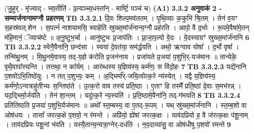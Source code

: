 \documentclass[17pt]{extarticle}
\begin{document}
{{{{{{{{{{{{{{{{{{{                  \newline
                                    (जु॒हुर् - मृ॑ज्याद् - भव॒तीति॑ - प्र॒त्यञ्च्य॒धस्ता᳚न् - मार्ष्टि॒ पञ्च॑ च) \textbf{(A1)} \newline \newline
                \textbf{ 3.3.2     अनुवाकं   2 - सम्मार्जनानामग्नौ प्रहरणम्} \newline
                                \textbf{ TB 3.3.2.1} \newline
                  दि॒वः शिल्प॒मव॑ततम् । पृ॒थि॒व्याः क॒कुभि॑ श्रि॒तम् । तेन॑ व॒यꣳ स॒हस्र॑वल्.शेन । स॒पत्नं॑ नाशयामसि॒ स्वाहेति॑ स्रुख्स॒मांर्ज॑नान्य॒ग्नौ प्रह॑रति । आपो॒ वै द॒र्भाः । रू॒पमे॒वैषा॑मे॒तन् म॑हि॒मानं॒ ॅव्याच॑ष्टे ॥ अ॒नु॒ष्टुभ॒र्चा । आनु॑ष्टुभः प्र॒जाप॑तिः । प्रा॒जा॒प॒त्यो वे॒दः । वे॒दस्याग्रꣳ॑ स्रुख्स॒मांर्ज॑नानि \textbf{ 6} \newline
                  \newline
                                \textbf{ TB 3.3.2.2} \newline
                  स्वेनै॒वैना॑नि॒ छन्द॑सा । स्वया॑ दे॒वत॑या॒ सम॑र्द्धयति । अथो॒ ऋग्वाव योषा᳚ । द॒र्भो वृषा᳚ । तन्मि॑थु॒नम् । मि॒थु॒नमे॒वास्य॒ तद्-य॒ज्ञे क॑रोति प्र॒जन॑नाय । प्रजा॑यते प्र॒जया॑ प॒शुभि॒र्-यज॑मानः ॥ तान्येके॒ वृथै॒वापा᳚स्यन्ति । तत्तथा॒ न का᳚र्यम् । आर॑ब्धस्य य॒ज्ञिय॑स्य॒ कर्म॑णः॒ स वि॑दो॒हः \textbf{ 7} \newline
                  \newline
                                \textbf{ TB 3.3.2.3} \newline
                  यद्ये॑नानि प॒शवो॑ऽभि॒तिष्ठे॑युः । न तत् प॒शुभ्यः॒ कम् । अ॒द्भिर्मा᳚र्-जयि॒त्वोत्क॒रे न्य॑स्येत् । यद्वै य॒ज्ञिय॑स्य॒ कर्म॑णो॒ऽन्यत्राहु॑तीभ्यः स॒न्तिष्ठ॑ते । उ॒त्क॒रो वाव तस्य॑ प्रति॒ष्ठा । ए॒ताꣳ हि तस्मै᳚ प्रति॒ष्ठां दे॒वाः स॒मभ॑रन्न् । यद॒द्भिर्मा॒र्जय॑ति । तेन॑ शा॒न्तम् । यदु॑त्क॒रे न्य॒स्यति॑ । प्र॒ति॒ष्ठामे॒वैना॑नि॒ तद्-ग॑मयति \textbf{ 8} \newline
                  \newline
                                \textbf{ TB 3.3.2.4} \newline
                  प्रति॑तिष्ठति प्र॒जया॑ प॒शुभि॒र्यज॑मानः ॥ अथो᳚ स्त॒म्बस्य॒ वा ए॒तद्-रू॒पम् । यथ् स्रु॑ख्स॒मांर्ज॑नानि । स्त॒म्ब॒शो वा ओष॑धयः । तासां᳚ जरत्क॒क्षे प॒शवो॒ न र॑मन्ते । अप्रि॑यो॒ ह्ये॑षां जरत्क॒क्षः । याव॑दप्रियो ह॒ वै ज॑रत्क॒क्षः प॑शू॒नाम् । ताव॑दप्रियः पशू॒नां भ॑वति । यस्यै॒तान्य॒न्यत्रा॒ग्नेर्-दध॑ति । न॒व॒दाव्या॑सु॒ वा ओष॑धीषु प॒शवो॑ रमन्ते \textbf{ 9} \newline
}}}}}}}}}}}}}}}}}}}
\end{document}
